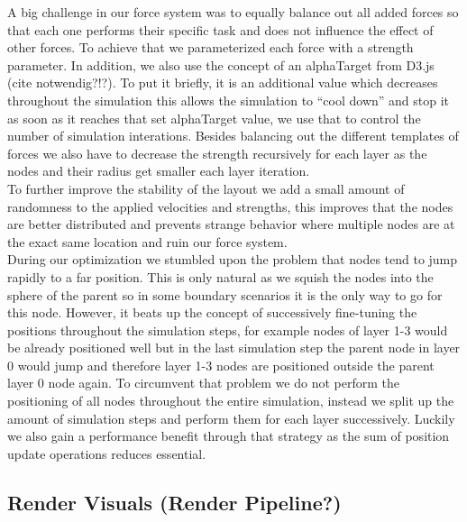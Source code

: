 A big challenge in our force system was to equally balance out all added forces so that each one performs their specific task and does not influence the effect of other forces. To achieve that we parameterized each force with a strength parameter.
In addition, we also use the concept of an alphaTarget from D3.js (cite notwendig?!?). To put it briefly, it is an additional value which decreases throughout the simulation this allows the simulation to “cool down” and stop it as soon as it reaches that set alphaTarget value, we use that to control the number of simulation interations. 
Besides balancing out the different templates of forces we also have to decrease the strength recursively for each layer as the nodes and their radius get smaller each layer iteration.\\
To further improve the stability of the layout we add a small amount of randomness to the applied velocities and strengths, this improves that the nodes are better distributed and prevents strange behavior where multiple nodes are at the exact same location and ruin our force system.\\
During our optimization we stumbled upon the problem that nodes tend to jump rapidly to a far position. This is only natural as we squish the nodes into the sphere of the parent so in some boundary scenarios it is the only way to go for this node. However, it beats up the concept of successively fine-tuning the positions throughout the simulation steps, for example nodes of layer 1-3 would be already positioned well but in the last simulation step the parent node in layer 0 would jump and therefore layer 1-3 nodes are positioned outside the parent layer 0 node again. To circumvent that problem we do not perform the positioning of all nodes throughout the entire simulation, instead we split up the amount of simulation steps and perform them for each layer successively. Luckily we also gain a performance benefit through that strategy as the sum of position update operations reduces essential.
\subsection{Render Visuals (Render Pipeline?)}

